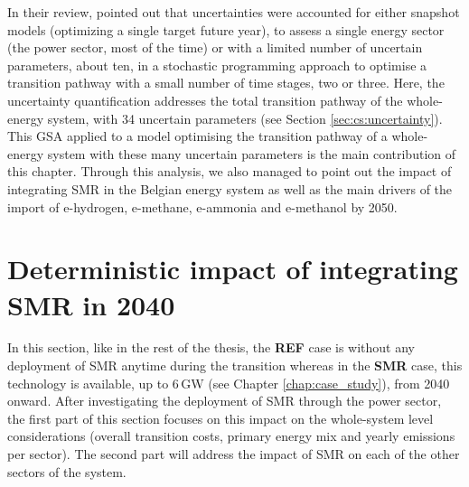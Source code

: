 In their review, \citet{yue2018review} pointed out that uncertainties were accounted for either snapshot models (\ie optimizing a single target future year), to assess a single energy sector (\ie the power sector, most of the time) or with a limited number of uncertain parameters, \ie about ten, in a stochastic programming approach to optimise a transition pathway with a small number of time stages, \ie two or three. Here, the uncertainty quantification addresses the total transition pathway of the whole-energy system, with 34 uncertain parameters (see Section \ref{sec:cs:uncertainty}). This \gls{GSA} applied to a model optimising the transition pathway of a whole-energy system with these many uncertain parameters is the main contribution of this chapter. Through this analysis, we also managed to point out the impact of integrating \gls{SMR} in the Belgian energy system as well as the main drivers of the import of e-hydrogen, e-methane, e-ammonia and e-methanol by 2050.



\section[Deterministic impact of integrating SMR in 2040]{Deterministic impact of integrating \gls{SMR} in 2040}
\label{sec:atom_mol:results_deter} 
In this section, like in the rest of the thesis, the \textbf{REF} case is without any deployment of \gls{SMR} anytime during the transition whereas in the \textbf{SMR} case, this technology is available, up to 6\,GW (see Chapter \ref{chap:case_study}), from 2040 onward. After investigating the deployment of \gls{SMR} through the power sector, the first part of this section focuses on this impact on the whole-system level considerations (\ie overall transition costs, primary energy mix and yearly emissions per sector). The second part will address the impact of \gls{SMR} on each of the other sectors of the system.

